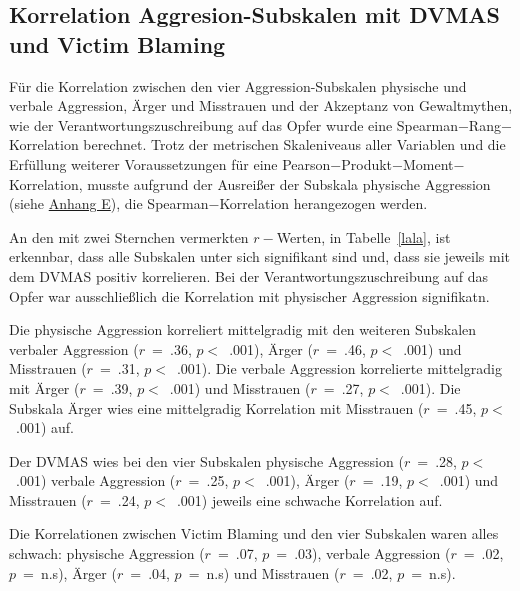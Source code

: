 

\subsection{Korrelation Aggresion-Subskalen mit DVMAS und Victim Blaming}  \label{subsec_4.4.1}
Für die Korrelation zwischen den vier Aggression-Subskalen physische und verbale Aggression, Ärger und Misstrauen und der Akzeptanz von Gewaltmythen, wie der Verantwortungszuschreibung auf das Opfer wurde eine Spearman$-$Rang$-$Korrelation berechnet. Trotz der metrischen Skaleniveaus aller Variablen und die Erfüllung weiterer Voraussetzungen für eine Pearson$-$Produkt$-$Moment$-$Korrelation, musste aufgrund der Ausreißer der Subskala physische Aggression (siehe \hyperref[Boxplot_phAggro]{Anhang E}), die Spearman$-$Korrelation herangezogen werden.

An den mit zwei Sternchen vermerkten $r-$Werten, in Tabelle~\ref{lala}, ist erkennbar, dass alle Subskalen unter sich signifikant sind und, dass sie jeweils mit dem DVMAS positiv korrelieren. Bei der Verantwortungszuschreibung auf das Opfer war ausschließlich die Korrelation mit physischer Aggression signifikatn.


Die physische Aggression korreliert mittelgradig mit den weiteren Subskalen verbaler Aggression ($r$~=~.36, $p<$~.001), Ärger ($r$~=~.46, $p<$~.001) und Misstrauen ($r$~=~.31, $p<$~.001).
Die verbale Aggression korrelierte mittelgradig mit Ärger ($r$~=~.39, $p<$~.001) und Misstrauen ($r$~=~.27, $p<$~.001).
Die Subskala Ärger wies eine mittelgradig Korrelation mit Misstrauen ($r$~=~.45, $p<$~.001) auf.

Der DVMAS wies bei den vier Subskalen physische Aggression ($r$~=~.28, $p<$~.001) verbale Aggression ($r$~=~.25, $p<$~.001), Ärger ($r$~=~.19, $p<$~.001) und Misstrauen ($r$~=~.24, $p<$~.001) jeweils eine schwache Korrelation auf.

Die Korrelationen zwischen Victim Blaming und den vier Subskalen waren alles schwach: physische Aggression ($r$~=~.07, $p$~=~.03), verbale Aggression ($r$~=~.02, $p$~=~n.s), Ärger ($r$~=~.04, $p$~=~n.s) und Misstrauen ($r$~=~.02, $p$~=~n.s).


